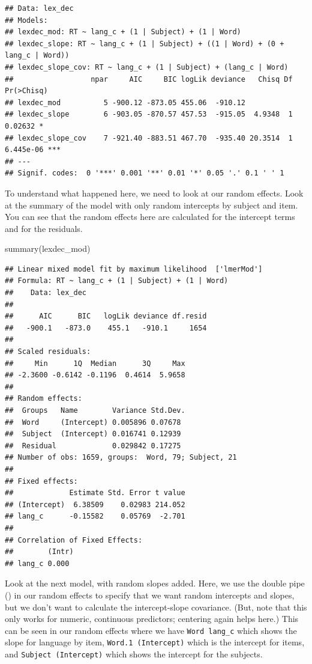 \documentclass[
]{book}
\newenvironment{Shaded}{\begin{snugshade}}{\end{snugshade}}
\newcommand{\FunctionTok}[1]{\textcolor[rgb]{0.00,0.00,0.00}{#1}}
\newcommand{\NormalTok}[1]{#1}
\begin{document}
\begin{verbatim}
## Data: lex_dec
## Models:
## lexdec_mod: RT ~ lang_c + (1 | Subject) + (1 | Word)
## lexdec_slope: RT ~ lang_c + (1 | Subject) + ((1 | Word) + (0 + lang_c | Word))
## lexdec_slope_cov: RT ~ lang_c + (1 | Subject) + (lang_c | Word)
##                  npar     AIC     BIC logLik deviance   Chisq Df Pr(>Chisq)    
## lexdec_mod          5 -900.12 -873.05 455.06  -910.12                          
## lexdec_slope        6 -903.05 -870.57 457.53  -915.05  4.9348  1    0.02632 *  
## lexdec_slope_cov    7 -921.40 -883.51 467.70  -935.40 20.3514  1  6.445e-06 ***
## ---
## Signif. codes:  0 '***' 0.001 '**' 0.01 '*' 0.05 '.' 0.1 ' ' 1
\end{verbatim}

To understand what happened here, we need to look at our random effects. Look at the summary of the model with only random intercepts by subject and item. You can see that the random effects here are calculated for the intercept terms and for the residuals.

\begin{Shaded}
\begin{Highlighting}[]
\FunctionTok{summary}\NormalTok{(lexdec\_mod)}
\end{Highlighting}
\end{Shaded}

\begin{verbatim}
## Linear mixed model fit by maximum likelihood  ['lmerMod']
## Formula: RT ~ lang_c + (1 | Subject) + (1 | Word)
##    Data: lex_dec
## 
##      AIC      BIC   logLik deviance df.resid 
##   -900.1   -873.0    455.1   -910.1     1654 
## 
## Scaled residuals: 
##     Min      1Q  Median      3Q     Max 
## -2.3600 -0.6142 -0.1196  0.4614  5.9658 
## 
## Random effects:
##  Groups   Name        Variance Std.Dev.
##  Word     (Intercept) 0.005896 0.07678 
##  Subject  (Intercept) 0.016741 0.12939 
##  Residual             0.029842 0.17275 
## Number of obs: 1659, groups:  Word, 79; Subject, 21
## 
## Fixed effects:
##             Estimate Std. Error t value
## (Intercept)  6.38509    0.02983 214.052
## lang_c      -0.15582    0.05769  -2.701
## 
## Correlation of Fixed Effects:
##        (Intr)
## lang_c 0.000
\end{verbatim}

Look at the next model, with random slopes added. Here, we use the double pipe (\texttt{\textbar{}\textbar{}}) in our random effects to specify that we want random intercepts and slopes, but we don't want to calculate the intercept-slope covariance. (But, note that this only works for numeric, continuous predictors; centering again helps here.) This can be seen in our random effects where we have \texttt{Word\ lang\_c} which shows the slope for language by item, \texttt{Word.1\ (Intercept)} which is the intercept for items, and \texttt{Subject\ (Intercept)} which shows the intercept for the subjects.
\end{document}
